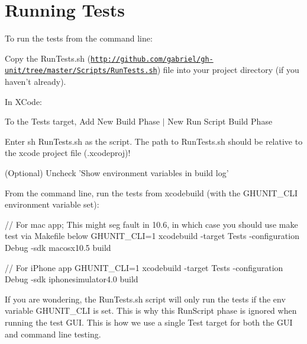 \hypertarget{_command_line_CommandLineRunningTests}{}\section{\-Running Tests}\label{_command_line_CommandLineRunningTests}
\-To run the tests from the command line\-:


\begin{DoxyItemize}
\item \-Copy the \-Run\-Tests.\-sh (\href{http://github.com/gabriel/gh-unit/tree/master/Scripts/RunTests.sh}{\tt http\-://github.\-com/gabriel/gh-\/unit/tree/master/\-Scripts/\-Run\-Tests.\-sh}) file into your project directory (if you haven't already).
\item \-In \-X\-Code\-:
\begin{DoxyItemize}
\item \-To the {\ttfamily \-Tests} target, \-Add {\ttfamily \-New \-Build \-Phase} $|$ {\ttfamily \-New \-Run \-Script \-Build \-Phase}
\item \-Enter {\ttfamily sh \-Run\-Tests.\-sh} as the script. \-The path to {\ttfamily \-Run\-Tests.\-sh} should be relative to the xcode project file (.xcodeproj)!
\begin{DoxyItemize}
\item (\-Optional) \-Uncheck '\-Show environment variables in build log'
\end{DoxyItemize}
\end{DoxyItemize}
\end{DoxyItemize}

\-From the command line, run the tests from xcodebuild (with the \-G\-H\-U\-N\-I\-T\-\_\-\-C\-L\-I environment variable set)\-:

\begin{DoxyVerb}
 // For mac app; This might seg fault in 10.6, in which case you should use make test via Makefile below
 GHUNIT_CLI=1 xcodebuild -target Tests -configuration Debug -sdk macosx10.5 build	
 
 // For iPhone app
 GHUNIT_CLI=1 xcodebuild -target Tests -configuration Debug -sdk iphonesimulator4.0 build
 \end{DoxyVerb}


\-If you are wondering, the {\ttfamily \-Run\-Tests.\-sh} script will only run the tests if the env variable \-G\-H\-U\-N\-I\-T\-\_\-\-C\-L\-I is set. \-This is why this \-Run\-Script phase is ignored when running the test \-G\-U\-I. \-This is how we use a single \-Test target for both the \-G\-U\-I and command line testing.

